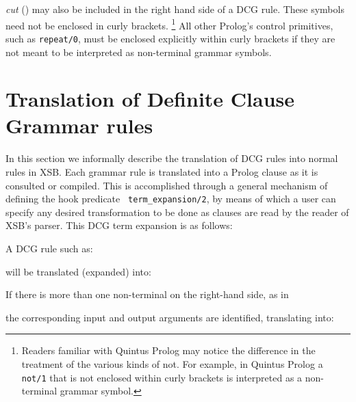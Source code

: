 \begin{enumerate}
      {\em cut} (\cut) may also be included in the 
      right hand side of a DCG rule. These symbols need not be enclosed in 
      curly brackets. 
      \footnote{Readers familiar with Quintus Prolog may notice the difference
                in the treatment of the various kinds of not. For example, in 
                Quintus Prolog a {\tt not/1} that is not enclosed within curly 
                brackets is interpreted as a non-terminal grammar symbol.}
      All other Prolog's control primitives, such as {\tt repeat/0}, must
      be enclosed explicitly within curly brackets if they are not meant
      to be interpreted as non-terminal grammar symbols.
\end{enumerate}
 

\section{Translation of Definite Clause Grammar rules}

In this section we informally describe the translation of DCG rules
into normal rules in XSB.  Each grammar rule is translated into a
Prolog clause as it is consulted or compiled.  This is accomplished
through a general mechanism of defining the hook predicate {\tt
term\_expansion/2},  by means of which
a user can specify any desired transformation to be done as clauses
are read by the reader of XSB's parser.  This DCG term expansion is as
follows:

A DCG rule such as:


\noindent
will be translated (expanded) into:


If there is more than one non-terminal on the right-hand side, as in


\noindent
the corresponding input and output arguments are identified, 
translating into:



